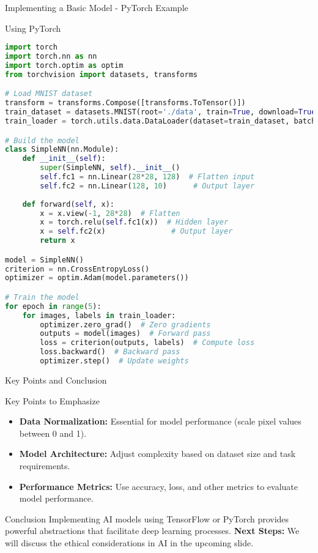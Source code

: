 \documentclass[aspectratio=169]{beamer}
\begin{document}
\begin{frame}[fragile]{Implementing a Basic Model - PyTorch Example}
    \begin{block}{Using PyTorch}
        \begin{lstlisting}[language=Python]
import torch
import torch.nn as nn
import torch.optim as optim
from torchvision import datasets, transforms

# Load MNIST dataset
transform = transforms.Compose([transforms.ToTensor()])
train_dataset = datasets.MNIST(root='./data', train=True, download=True, transform=transform)
train_loader = torch.utils.data.DataLoader(dataset=train_dataset, batch_size=64, shuffle=True)

# Build the model
class SimpleNN(nn.Module):
    def __init__(self):
        super(SimpleNN, self).__init__()
        self.fc1 = nn.Linear(28*28, 128)  # Flatten input
        self.fc2 = nn.Linear(128, 10)      # Output layer
        
    def forward(self, x):
        x = x.view(-1, 28*28)  # Flatten
        x = torch.relu(self.fc1(x))  # Hidden layer
        x = self.fc2(x)               # Output layer
        return x

model = SimpleNN()
criterion = nn.CrossEntropyLoss()
optimizer = optim.Adam(model.parameters())

# Train the model
for epoch in range(5):
    for images, labels in train_loader:
        optimizer.zero_grad()  # Zero gradients
        outputs = model(images)  # Forward pass
        loss = criterion(outputs, labels)  # Compute loss
        loss.backward()  # Backward pass
        optimizer.step()  # Update weights
        \end{lstlisting}
    \end{block}
\end{frame}

\begin{frame}[fragile]{Key Points and Conclusion}
    \begin{block}{Key Points to Emphasize}
        \begin{itemize}
            \item \textbf{Data Normalization:} Essential for model performance (scale pixel values between 0 and 1).
            \item \textbf{Model Architecture:} Adjust complexity based on dataset size and task requirements.
            \item \textbf{Performance Metrics:} Use accuracy, loss, and other metrics to evaluate model performance.
        \end{itemize}
    \end{block}
    
    \begin{block}{Conclusion}
        Implementing AI models using TensorFlow or PyTorch provides powerful abstractions that facilitate deep learning processes. 
        \textbf{Next Steps:} We will discuss the ethical considerations in AI in the upcoming slide.
    \end{block}
\end{frame}
\end{document}
